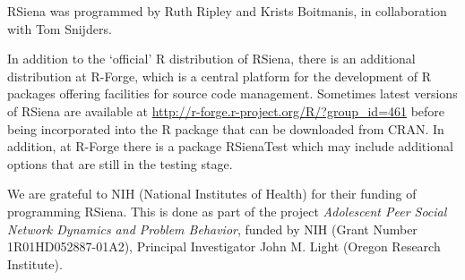 \documentclass[a4paper,fleqn]{article}
\newcommand{\+}{\, + \,}
\newcommand{\R}{{\sf R }}
\newcommand{\rs}{{\sf RSiena}}
\newcommand{\RS}{{\sf RSiena }}
\newcommand{\SI}{{\sf SIENA }}
\begin{document}
\RS was programmed by Ruth Ripley and Krists Boitmanis, in collaboration with Tom Snijders.

In addition to the `official' \R distribution of \rs, there is
an additional distribution at R-Forge, which is
a central platform for the development of \R packages
offering facilities for source code management.
Sometimes latest versions of \RS are available at
\url{http://r-forge.r-project.org/R/?group_id=461}
before being incorporated into the R package that can be downloaded from CRAN.
In addition, at R-Forge there is a package RSienaTest which may include
additional options that are still in the testing stage.

We are grateful to NIH (National Institutes of Health)
for their funding of programming \rs.
This is done
as part of the project \emph{Adolescent Peer Social Network Dynamics
and Problem Behavior}, funded by NIH (Grant Number 1R01HD052887-01A2),
Principal Investigator John M. Light (Oregon Research Institute).
\end{document}
